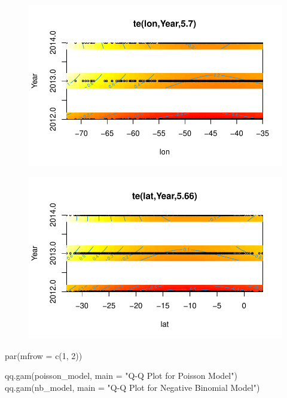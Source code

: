 \documentclass[
  letterpaper,
  DIV=11,
  numbers=noendperiod]{scrartcl}
\newenvironment{Shaded}{\begin{snugshade}}{\end{snugshade}}
\newcommand{\AttributeTok}[1]{\textcolor[rgb]{0.40,0.45,0.13}{#1}}
\newcommand{\DecValTok}[1]{\textcolor[rgb]{0.68,0.00,0.00}{#1}}
\newcommand{\FunctionTok}[1]{\textcolor[rgb]{0.28,0.35,0.67}{#1}}
\newcommand{\NormalTok}[1]{\textcolor[rgb]{0.00,0.23,0.31}{#1}}
\newcommand{\StringTok}[1]{\textcolor[rgb]{0.13,0.47,0.30}{#1}}
\begin{document}
\begin{figure}[H]

{\centering \includegraphics{Group34Coursework_files/figure-pdf/unnamed-chunk-18-10.pdf}

}

\end{figure}

\begin{figure}[H]

{\centering \includegraphics{Group34Coursework_files/figure-pdf/unnamed-chunk-18-11.pdf}

}

\end{figure}

\begin{Shaded}
\begin{Highlighting}[]
\FunctionTok{par}\NormalTok{(}\AttributeTok{mfrow =} \FunctionTok{c}\NormalTok{(}\DecValTok{1}\NormalTok{, }\DecValTok{2}\NormalTok{))}

\FunctionTok{qq.gam}\NormalTok{(poisson\_model, }\AttributeTok{main =} \StringTok{"Q{-}Q Plot for Poisson Model"}\NormalTok{)}
\FunctionTok{qq.gam}\NormalTok{(nb\_model, }\AttributeTok{main =} \StringTok{"Q{-}Q Plot for Negative Binomial Model"}\NormalTok{)}
\end{Highlighting}
\end{Shaded}
\end{document}

